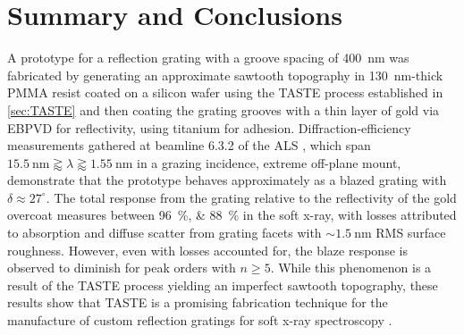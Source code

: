 \section{Summary and Conclusions}\label{sec:ch3summary}
A prototype for a reflection grating with a groove spacing of \SI{400}{\nm} was fabricated by generating an approximate sawtooth topography in \SI{130}{\nm}-thick PMMA resist coated on a silicon wafer using the TASTE process established in \cref{sec:TASTE} and then coating the grating grooves with a thin layer of gold via EBPVD for reflectivity, using titanium for adhesion. %
Diffraction-efficiency measurements gathered at beamline 6.3.2 of the ALS \cite{ALS_632,Underwood96,Gullikson01}, which span $\SI{15.5}{\nm} \gtrapprox \lambda \gtrapprox \SI{1.55}{\nm}$ in a grazing incidence, extreme off-plane mount, demonstrate that the prototype behaves approximately as a blazed grating with $\delta \approx 27^{\circ}$. %
The total response from the grating relative to the reflectivity of the gold overcoat measures between \SIlist{96;88}{\percent} in the soft x-ray, with losses attributed to absorption and diffuse scatter from grating facets with $\sim \SI{1.5}{\nm}$ RMS surface roughness. 
However, even with losses accounted for, the blaze response is observed to diminish for peak orders with $n \geq 5$. 
While this phenomenon is a result of the TASTE process yielding an imperfect sawtooth topography, these results show that TASTE is a promising fabrication technique for the manufacture of custom reflection gratings for soft x-ray spectroscopy \cite{McCoy18,McCoy20}.

